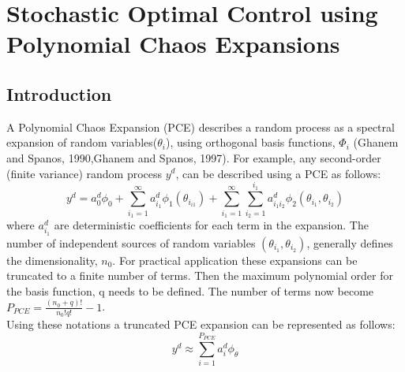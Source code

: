 \section{Stochastic Optimal Control using Polynomial Chaos Expansions}

\subsection{Introduction}
A Polynomial Chaos Expansion (PCE) describes a random process as a spectral expansion of random variables($\theta_{i}$), using orthogonal basis functions, $\Phi_{i}$ (Ghanem and Spanos, 1990,Ghanem and Spanos, 1997). For example, any second-order (finite variance) random process $y^{d}$, can be described using a PCE as follows:
\begin{equation}
y^{d} = a_{0}^{d}\phi_{0} + \sum_{i_{1}=1}^{\infty} a_{i_{1}}^{d}\phi_{1}(\theta_{i_{i1}}) + \sum_{i_{1}=1}^{\infty}\sum_{i_{2}=1}^{i_{1}} a_{i_{1}i_{2}}^d\phi_{2}(\theta_{i_{1}},\theta_{i_{2}})
\end{equation}
where $a_{i_{1}}^d$  are deterministic coefficients for each term in the expansion. The number of independent sources of random variables $(\theta_{i_{1}}, \theta_{i_{2}})$, generally defines the dimensionality, $n_{0}$. For practical application these expansions can be
truncated to a finite number of terms. Then the maximum polynomial order for the basis function, q needs to be defined.
The number of terms now become $P_{PCE} = \frac{(n_{0}+q)!}{n_{0}!q!} -1 $. \\
Using these notations a truncated PCE expansion can be represented as follows:
\begin{equation}
y^{d} \approx \sum_{i=1}^{P_{PCE}} a_{i}^{d}\phi_{\theta}
\end{equation}

